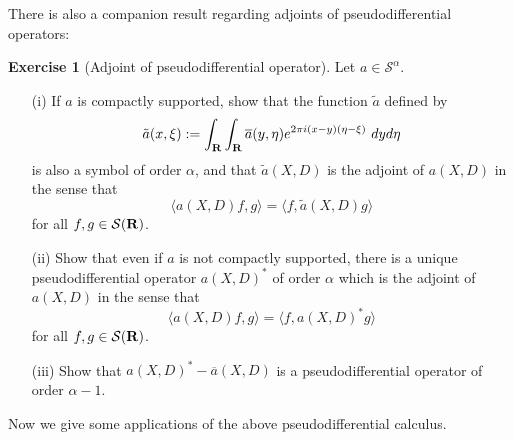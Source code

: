 \documentclass[11pt]{article}
\theoremstyle{definition}
\newtheorem{exercise}[theorem]{Exercise}
\begin{document}
There is also a companion result regarding adjoints of pseudodifferential operators:

\begin{exercise}[Adjoint of pseudodifferential operator]
 \label{adj-p} Let \({a \in {\mathcal S}^\alpha}\). 
\begin{itemize}

\item[(i)] If \({a}\) is compactly supported, show that the function \({\tilde a}\) defined by
\[\displaystyle  \tilde a(x,\xi) := \int_{\bf R} \int_{\bf R} \overline{a}(y,\eta) e^{2\pi i (x-y)(\eta-\xi)}\ dy d\eta\]
 is also a symbol of order \({\alpha}\), and that \({\tilde a(X,D)}\) is the adjoint of \({a(X,D)}\) in the sense that 
\[\displaystyle  \langle a(X,D) f, g \rangle = \langle f, \tilde a(X,D) g \rangle\]
 for all \({f,g \in {\mathcal S}({\bf R})}\). 
\item[(ii)] Show that even if \({a}\) is not compactly supported, there is a unique pseudodifferential operator \({a(X,D)^*}\) of order \({\alpha}\) which is the adjoint of \({a(X,D)}\) in the sense that
\[\displaystyle  \langle a(X,D) f, g \rangle = \langle f, a(X,D)^* g \rangle\]
 for all \({f,g \in {\mathcal S}({\bf R})}\). 
\item[(iii)] Show that \({a(X,D)^* - \overline{a}(X,D)}\) is a pseudodifferential operator of order \({\alpha-1}\).


\end{itemize}

\end{exercise}

Now we give some applications of the above pseudodifferential calculus.
\end{document}
